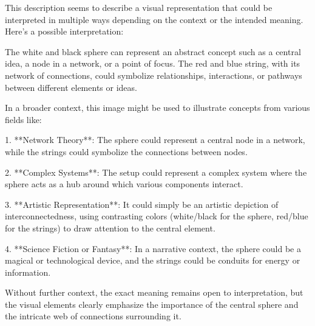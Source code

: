 This description seems to describe a visual representation that could be interpreted in multiple ways depending on the context or the intended meaning. Here's a possible interpretation:

The white and black sphere can represent an abstract concept such as a central idea, a node in a network, or a point of focus. The red and blue string, with its network of connections, could symbolize relationships, interactions, or pathways between different elements or ideas.

In a broader context, this image might be used to illustrate concepts from various fields like:

1. **Network Theory**: The sphere could represent a central node in a network, while the strings could symbolize the connections between nodes.
   
2. **Complex Systems**: The setup could represent a complex system where the sphere acts as a hub around which various components interact.

3. **Artistic Representation**: It could simply be an artistic depiction of interconnectedness, using contrasting colors (white/black for the sphere, red/blue for the strings) to draw attention to the central element.

4. **Science Fiction or Fantasy**: In a narrative context, the sphere could be a magical or technological device, and the strings could be conduits for energy or information.

Without further context, the exact meaning remains open to interpretation, but the visual elements clearly emphasize the importance of the central sphere and the intricate web of connections surrounding it.